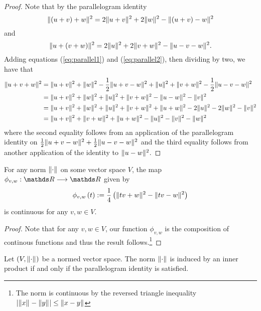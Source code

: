 \begin{proof}
Note that by the parallelogram identity
\begin{equation}
\lVert\left(u+v\right)+w\rVert_{}^{2}=2\lVert u+v\rVert_{}^{2}+2\lVert w\rVert_{}^{2}-\lVert\left(u+v\right)-w\rVert_{}^{2}\label{eq:parallel1}
\end{equation}
and 
\begin{equation}
\lVert u+\left(v+w\right)\rVert_{}^{2}=2\lVert u\rVert_{}^{2}+2\lVert v+w\rVert_{}^{2}-\lVert u-v-w\rVert_{}^{2}.\label{eq:parallel2}
\end{equation}
Adding equations (\ref{eq:parallel1}) and (\ref{eq:parallel2}),
then dividing by two, we have that 
\begin{align*}
\lVert u+v+w\rVert_{}^{2} & =\lVert u+v\rVert_{}^{2}+\lVert w\rVert_{}^{2}-\frac{1}{2}\lVert u+v-w\rVert_{}^{2}+\lVert u\rVert_{}^{2}+\lVert v+w\rVert_{}^{2}-\frac{1}{2}\lVert u-v-w\rVert_{}^{2}\\
 & =\lVert u+v\rVert_{}^{2}+\lVert w\rVert_{}^{2}+\lVert u\rVert_{}^{2}+\lVert v+w\rVert_{}^{2}-\lVert u-w\rVert_{}^{2}-\lVert v\rVert_{}^{2}\\
 & =\lVert u+v\rVert_{}^{2}+\lVert w\rVert_{}^{2}+\lVert u\rVert_{}^{2}+\lVert v+w\rVert_{}^{2}+\lVert u+w\rVert_{}^{2}-2\lVert u\rVert_{}^{2}-2\lVert w\rVert_{}^{2}-\lVert v\rVert_{}^{2}\\
 & =\lVert u+v\rVert_{}^{2}+\lVert v+w\rVert_{}^{2}+\lVert u+w\rVert_{}^{2}-\lVert u\rVert_{}^{2}-\lVert v\rVert_{}^{2}-\lVert w\rVert_{}^{2}
\end{align*}
where the second equality follows from an application of the parallelogram
identity on $\frac{1}{2}\lVert u+v-w\rVert_{}^{2}+\frac{1}{2}\lVert u-v-w\rVert_{}^{2}$
and the third equality follows from another application of the identity
to $\lVert u-w\rVert_{}^{2}$.
\end{proof}
\begin{lem}
\label{lem:continuityNorm}For any norm $\lVert\cdot\rVert_{}$ on some
vector space $V$, the map $\phi_{v,w}:\R\longrightarrow\R$ given
by
\[
\phi_{v,w}\left(t\right):=\frac{1}{4}\left(\lVert tv+w\rVert_{}^{2}-\lVert tv-w\rVert_{}^{2}\right)
\]
is continuous for any $v,w\in V$.
\end{lem}

\begin{proof}
Note that for any $v,w\in V$, our function $\phi_{v,w}$ is the composition
of continous functions and thus the result follows.\footnote{The norm is continuous by the reversed triangle inequality $\lvert\lVert x\rVert_{}-\lVert y\rVert_{}\rvert\leq\lVert x-y\rVert_{}$}
\end{proof}
\begin{thm}
\label{thm:parallelogram}Let $\left(V,\lVert\cdot\rVert_{}\right)$ be
a normed vector space. The norm $\lVert\cdot\rVert_{}$ is induced by an
inner product if and only if the parallelogram identity is satisfied.
\end{thm}

